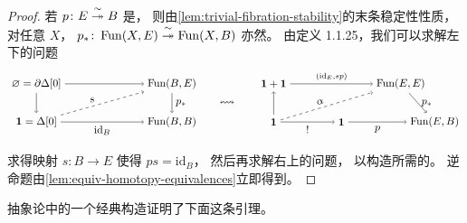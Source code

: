 \begin{proof}
若 $p\colon E\mathrel{\stackrel{\sim}{\twoheadrightarrow}} B$ 是\trTrivialFibration{}，
则由\cref{lem:trivial-fibration-stability}的末条稳定性性质，
对任意\trInfinityCategory{} $X$，
$p_\ast\colon\operatorname{Fun}(X,E)\mathrel{\stackrel{\sim}{\twoheadrightarrow}}\operatorname{Fun}(X,B)$ 亦然。
由定义 1.1.25，我们可以求解左下的\trLifting{}问题 %
\begin{equation*}
\begin{tikzpicture}[xscale=1.38,yscale=1.25]
\node (TL) at (0,1) {$\varnothing=\partial\Delta[0]$};
\node (TR) at (3.2,1) {$\Fun(B,E)$};
\node (BL) at (0,0) {$\mathbf{1}=\Delta[0]$};
\node (BR) at (3.2,0) {$\Fun(B,B)$};
\draw[->] (TL) -- (TR);
\draw[->] (TL) -- (BL);
\draw[->] (BL) -- (BR) node[midway,below]{$\mathrm{id}_B$};
\draw[->] (TR) -- (BR) node[midway,right]{$p_\ast$};
\draw[dashed,->] (BL) -- (TR) node[pos=0.4,above,sloped]{$s$};
\node at (4.5,0.5) {$\leftrightsquigarrow$};
\node (rTL) at (5.6,1) {$\mathbf{1}+\mathbf{1}$};
\node (rTR) at (8.6,1) {$\Fun(E,E)$};
\node (rBL) at (5.6,0) {$\mathbf{1}$};
\node (rBM) at (7.2,0) {$\mathbf{1}$};
\node (rBR) at (9.4,0) {$\Fun(E,B)$};
\draw[->] (rTL) -- (rTR) node[midway,above]{$\scriptstyle(\mathrm{id}_E,sp)$};
\draw[->] (rBL) -- (rTL);
\draw[->] (rBL) -- (rBM) node[midway,below]{$!$};
\draw[->] (rBM) -- (rBR) node[midway,below]{$p$};
\draw[->] (rTR) -- (rBR) node[midway,right]{$p_\ast$};
\draw[dashed,->] (rBL) -- (rTR) node[pos=0.45,above,sloped]{$\alpha$};
\end{tikzpicture}
\end{equation*}
求得映射 $s\colon B\to E$ 使得 $ps=\mathrm{id}_B$，
然后再求解右上的\trLifting{}问题，
以构造所需的\trFibration{}\trHomotopy{}。
逆命题由\cref{lem:equiv-homotopy-equivalences}立即得到。
\end{proof}

抽象\trHomotopy{}论中的一个经典构造证明了下面这条引理。

